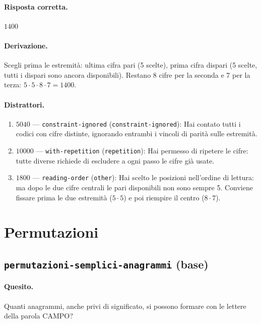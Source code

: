 \paragraph{Risposta corretta.} $1400$

\paragraph{Derivazione.} Scegli prima le estremità: ultima cifra pari (5 scelte), prima cifra dispari (5 scelte, tutti i dispari sono ancora disponibili). Restano 8 cifre per la seconda e 7 per la terza: $5 \cdot  5 \cdot  8 \cdot  7 = 1400$.

\paragraph{Distrattori.}
\begin{enumerate}
  \item $5040$ --- \texttt{constraint-ignored} (\texttt{constraint-ignored}): Hai contato tutti i codici con cifre distinte, ignorando entrambi i vincoli di parità sulle estremità.
  \item $10000$ --- \texttt{with-repetition} (\texttt{repetition}): Hai permesso di ripetere le cifre: \guillemotleft{}tutte diverse\guillemotright{} richiede di escludere a ogni passo le cifre già usate.
  \item $1800$ --- \texttt{reading-order} (\texttt{other}): Hai scelto le posizioni nell'ordine di lettura: ma dopo le due cifre centrali le pari disponibili non sono sempre 5. Conviene fissare prima le due estremità ($5 \cdot  5$) e poi riempire il centro ($8 \cdot  7$).
\end{enumerate}

\section{Permutazioni}

\subsection{\texorpdfstring{\texttt{permutazioni-semplici-anagrammi} (base)}{permutazioni-semplici-anagrammi (base)}}

\paragraph{Quesito.} Quanti anagrammi, anche privi di significato, si possono formare con le lettere della parola CAMPO?

